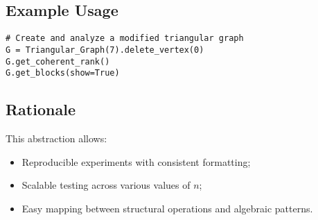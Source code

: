 \subsection*{Example Usage}
\begin{verbatim}
# Create and analyze a modified triangular graph
G = Triangular_Graph(7).delete_vertex(0)
G.get_coherent_rank()
G.get_blocks(show=True)
\end{verbatim}

\subsection*{Rationale}
This abstraction allows:
\begin{itemize}
    \item Reproducible experiments with consistent formatting;
    \item Scalable testing across various values of $n$;
    \item Easy mapping between structural operations and algebraic patterns.
\end{itemize}
